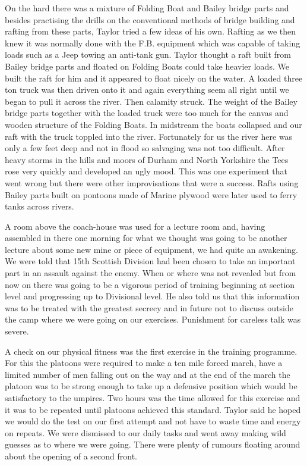 On the hard there was a mixture of Folding Boat and Bailey bridge
parts and besides practising the drills on the conventional methods of
bridge building and rafting from these parts, \lieutenant Taylor tried
a few ideas of his own. Rafting as we then knew it was normally done
with the F.B. equipment which was capable of taking loads such as a
Jeep towing an anti-tank gun. \Lieutenant Taylor thought a raft built
from Bailey bridge parts and floated on Folding Boats could take
heavier loads. We built the raft for him and it appeared to float
nicely on the water. A loaded three ton truck was then driven onto it
and again everything seem all right until we began to pull it across
the river. Then calamity struck. The weight of the Bailey bridge parts
together with the loaded truck were too much for the canvas and wooden
structure of the Folding Boats. In midstream the boats collapsed and
our raft with the truck toppled into the river.  Fortunately for us
the river here was only a few feet deep and not in flood so salvaging
was not too difficult.  After heavy storms in the hills and moors of
Durham and North Yorkshire the Tees rose very quickly and developed an
ugly mood. This was one experiment that went wrong but there were
other improvisations that were a success. Rafts using Bailey parts
built on pontoons made of Marine plywood were later used to ferry
tanks across rivers.

A room above the coach-house was used for a lecture room and, having
assembled in there one morning for what we thought was going to be
another lecture about some new mine or piece of equipment, we had
quite an awakening. We were told that 15th Scottish Division had been
chosen to take an important part in an assault against the enemy. When
or where was not revealed but from now on there was going to be a
vigorous period of training beginning at section level and progressing
up to Divisional level. He also told us that this information was to
be treated with the greatest secrecy and in future not to discuss
outside the camp where we were going on our exercises. Punishment for
careless talk was severe.

A check on our physical fitness was the first exercise in the training
programme. For this the platoons were required to make a ten mile
forced march, have a limited number of men falling out on the way and
at the end of the march the platoon was to be strong enough to take up
a defensive position which would be satisfactory to the umpires. Two
hours was the time allowed for this exercise and it was to be repeated
until platoons achieved this standard. \Lieutenant Taylor said he hoped
we would do the test on our first attempt and not have to waste time
and energy on repeats. We were dismissed to our daily tasks and went
away making wild guesses as to where we were going. There were plenty
of rumours floating around about the opening of a second front.

